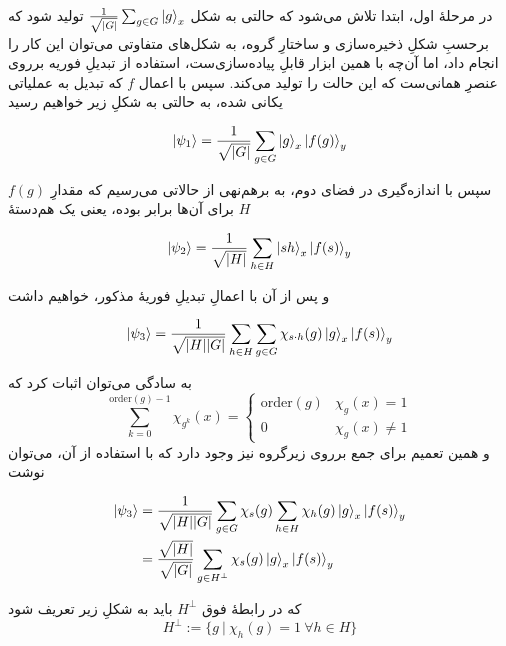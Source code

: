 در مرحلهٔ اول، ابتدا تلاش می‌شود که حالتی به شکل
\(\frac{1}{\sqrt{\abs{G}}}\sum_{g \in G} \ket{g}_x\)
تولید شود که برحسبِ شکلِ ذخیره‌سازی و ساختارِ گروه، به شکل‌های متفاوتی می‌توان این کار را انجام داد، اما آن‌چه با همین ابزار قابلِ پیاده‌سازی‌ست، استفاده از تبدیلِ فوریه برروی عنصرِ همانی‌ست که این حالت را تولید می‌کند. سپس با اعمال \(f\) که تبدیل به عملیاتی یکانی شده، به حالتی به شکلِ زیر خواهیم رسید

\begin{equation}
    \ket{\psi_1} = \frac{1}{\sqrt{\abs{G}}}\sum_{g \in G} \ket{g}_x\ket{f(g)}_y
\end{equation}

سپس با اندازه‌گیری در فضای دوم، به برهم‌نهی از حالاتی می‌رسیم که مقدارِ 
\(f(g)\)
برای آن‌ها برابر بوده، یعنی یک هم‌دستهٔ \(H\)

\begin{equation}
    \ket{\psi_2} = \frac{1}{\sqrt{\abs{H}}} \sum_{h \in H} \ket{sh}_x \ket{f(s)}_y
\end{equation}

و پس از آن با اعمالِ تبدیلِ فوریهٔ مذکور، خواهیم داشت

\begin{equation}
    \ket{\psi_3} = \frac{1}{\sqrt{\abs{H} \abs{G}}} \sum_{h \in H} \sum_{g \in G} \chi_{s \cdot h}(g)\ket{g}_x \ket{f(s)}_y
\end{equation}

به سادگی می‌توان اثبات کرد که 
\begin{equation}
    \sum_{k = 0}^{\mathrm{order}(g) - 1} \chi_{g^k}(x) = \begin{cases} \mathrm{order}(g) & \chi_g(x) = 1 \\
0 & \chi_g(x) \ne 1 \end{cases}
\end{equation}
و همین تعمیم برای جمع برروی زیرگروه نیز وجود دارد که با استفاده از آن، می‌توان نوشت 

\begin{align}
    \ket{\psi_3} &= \frac{1}{\sqrt{\abs{H} \abs{G}}} \sum_{g \in G} \chi_s(g) \sum_{h \in H} \chi_{h}(g)\ket{g}_x \ket{f(s)}_y \\
    &= \frac{\sqrt{\abs{H}}}{\sqrt{\abs{G}}} \sum_{g \in H^\perp} \chi_s(g) \ket{g}_x \ket{f(s)}_y
\end{align}

که در رابطهٔ فوق \(H^\perp\) باید به شکلِ زیر تعریف شود
\begin{equation}
    H^\perp := \{g ~|~ \chi_h(g) = 1 ~ \forall h \in H\}
\end{equation}

